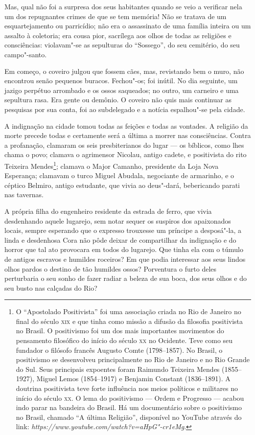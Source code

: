 Mas, qual não foi a surpresa dos seus habitantes quando se veio a
verificar nela um dos repugnantes crimes de que se tem memória! Não se
tratava de um esquartejamento ou parricídio; não era o assassinato de
uma família inteira ou um assalto à coletoria; era cousa pior, sacrílega
aos olhos de todas as religiões e consciências: violavam"-se as
sepulturas do ``Sossego'', do seu cemitério, do seu campo"-santo.

Em começo, o coveiro julgou que fossem cães, mas, revistando bem o muro,
não encontrou senão pequenos buracos. Fechou"-os; foi inútil. No dia
seguinte, um jazigo perpétuo arrombado e os ossos saqueados; no outro,
um carneiro e uma sepultura rasa. Era gente ou demônio. O coveiro não
quis mais continuar as pesquisas por sua conta, foi ao subdelegado e a
notícia espalhou"-se pela cidade.

A indignação na cidade tomou todas as feições e todas as vontades. A
religião da morte precede todas e certamente será a última a morrer nas
consciências. Contra a profanação, clamaram os seis presbiterianos do
lugar --- os bíblicos, como lhes chama o povo; clamava o agrimensor
Nicolau, antigo cadete, e positivista do rito Teixeira Mendes\footnote{O
  ``Apostolado Positivista'' foi uma associação criada no Rio de Janeiro
  no final do século \textsc{xix} e que tinha como missão a difusão da filosofia
  positivista no Brasil. O positivismo foi um dos mais importantes
  movimentos do pensamento filosófico do início do século \textsc{xx} no
  Ocidente. Teve como seu fundador o filósofo francês Augusto Comte
  (1798--1857). No Brasil, o positivismo se desenvolveu principalmente
  no Rio de Janeiro e no Rio Grande do Sul. Seus principais expoentes
  foram Raimundo Teixeira Mendes (1855--1927), Miguel Lemos (1854--1917) e Benjamin Constant (1836--1891). A doutrina positivista teve
  forte influência nos meios políticos e militares no início do século
  \textsc{xx}. O lema do positivismo --- Ordem e Progresso --- acabou indo parar na
  bandeira do Brasil. Há um documentário sobre o positivismo no Brasil,
  chamado ``A última Religião'', disponível no YouTube através do link:
  \emph{https://www.youtube.com/watch?v=aHpG"-cr1eMg}.}; clamava o Major
Camanho, presidente da Loja Nova Esperança; clamavam o turco Miguel
Abudala, negociante de armarinho, e o céptico Belmiro, antigo estudante,
que vivia ao deus"-dará, bebericando parati nas tavernas.

A própria filha do engenheiro residente da estrada de ferro, que vivia
desdenhando aquele lugarejo, sem notar sequer os suspiros dos
apaixonados locais, sempre esperando que o expresso trouxesse um
príncipe a desposá"-la, a linda e desdenhosa Cora não pôde deixar de
compartilhar da indignação e do horror que tal ato provocara em todos do
lugarejo. Que tinha ela com o túmulo de antigos escravos e humildes
roceiros? Em que podia interessar aos seus lindos olhos pardos o destino
de tão humildes ossos? Porventura o furto deles perturbaria o seu sonho
de fazer radiar a beleza de sua boca, dos seus olhos e do seu busto nas
calçadas do Rio?

